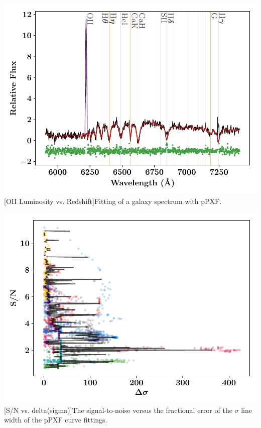 \documentclass[12pt, twocolumn]{revtex4}    %
\begin{document}
\begin{center}
\includegraphics[width=1.0\linewidth]{data/cube_1804_fitted}
[OII Luminosity vs. Redshift]{Fitting of a galaxy spectrum with pPXF.}
\label{fig:ppxf_spectra}
\end{center}

\begin{center}
\includegraphics[width=1.0\linewidth]{data/reprocessed_sn_vs_delta_sigma}
[S/N vs. delta(sigma)]{The signal-to-noise versus the fractional error of the $\sigma$ line width of the pPXF curve fittings.}
\label{fig:oiiluminosity_redshift}
\end{center}

%
\end{document}
